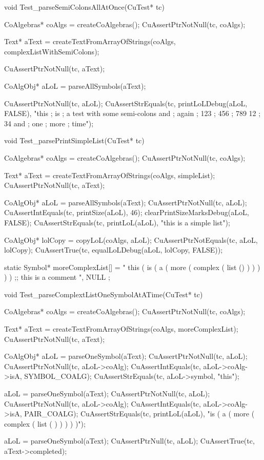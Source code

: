 void Test_parseSemiColonsAllAtOnce(CuTest* tc) {
  CoAlgebras* coAlgs = createCoAlgebras();
  CuAssertPtrNotNull(tc, coAlgs);

  Text* aText =
    createTextFromArrayOfStrings(coAlgs, complexListWithSemiColons);

  CuAssertPtrNotNull(tc, aText);

  CoAlgObj* aLoL = parseAllSymbols(aText);

  CuAssertPtrNotNull(tc, aLoL);
  CuAssertStrEquals(tc, printLoLDebug(aLoL, FALSE),
    "this ; is ; a test with some semi-colons and ; again ; 123 ; 456 ; 789 12 ; 34 and ; one ; more ; time");
}

void Test_parsePrintSimpleList(CuTest* tc) {
  CoAlgebras* coAlgs = createCoAlgebras();
  CuAssertPtrNotNull(tc, coAlgs);

  Text* aText = createTextFromArrayOfStrings(coAlgs, simpleList);
  CuAssertPtrNotNull(tc, aText);

  CoAlgObj* aLoL = parseAllSymbols(aText);
  CuAssertPtrNotNull(tc, aLoL);
  CuAssertIntEquals(tc, printSize(aLoL), 46);
  clearPrintSizeMarksDebug(aLoL, FALSE);
  CuAssertStrEquals(tc, printLoL(aLoL), "this is a simple list");

  CoAlgObj* lolCopy = copyLoL(coAlgs, aLoL);
  CuAssertPtrNotEquals(tc, aLoL, lolCopy);
  CuAssertTrue(tc, equalLoLDebug(aLoL, lolCopy, FALSE));
}

static Symbol* moreComplexList[] = {
 " this ( is ( a ( more ( complex ( list () ) ) ) ) ) ;; this is a comment ",
 NULL
};

void Test_parseComplextListOneSymbolAtATime(CuTest* tc) {
  CoAlgebras* coAlgs = createCoAlgebras();
  CuAssertPtrNotNull(tc, coAlgs);

  Text* aText = createTextFromArrayOfStrings(coAlgs, moreComplexList);
  CuAssertPtrNotNull(tc, aText);

  CoAlgObj* aLoL = parseOneSymbol(aText);
  CuAssertPtrNotNull(tc, aLoL);
  CuAssertPtrNotNull(tc, aLoL->coAlg);
  CuAssertIntEquals(tc, aLoL->coAlg->isA, SYMBOL_COALG);
  CuAssertStrEquals(tc, aLoL->symbol, "this");

  aLoL = parseOneSymbol(aText);
  CuAssertPtrNotNull(tc, aLoL);
  CuAssertPtrNotNull(tc, aLoL->coAlg);
  CuAssertIntEquals(tc, aLoL->coAlg->isA, PAIR_COALG);
  CuAssertStrEquals(tc, printLoL(aLoL),
                    "is ( a ( more ( complex ( list ( ) ) ) ) )");

  aLoL = parseOneSymbol(aText);
  CuAssertPtrNull(tc, aLoL);
  CuAssertTrue(tc, aText->completed);
}


